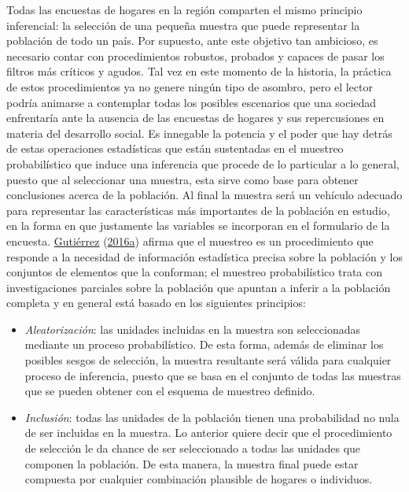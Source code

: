 \documentclass[
  12pt,
  spanish,
]{book}
\providecommand{\tightlist}{%
  \setlength{\itemsep}{0pt}\setlength{\parskip}{0pt}}
\begin{document}
Todas las encuestas de hogares en la región comparten el mismo principio inferencial: la selección de una pequeña muestra que puede representar la población de todo un país. Por supuesto, ante este objetivo tan ambicioso, es necesario contar con procedimientos robustos, probados y capaces de pasar los filtros más críticos y agudos. Tal vez en este momento de la historia, la práctica de estos procedimientos ya no genere ningún tipo de asombro, pero el lector podría animarse a contemplar todas los posibles escenarios que una sociedad enfrentaría ante la ausencia de las encuestas de hogares y sus repercusiones en materia del desarrollo social. Es innegable la potencia y el poder que hay detrás de estas operaciones estadísticas que están sustentadas en el muestreo probabilístico que induce una inferencia que procede de lo particular a lo general, puesto que al seleccionar una muestra, esta sirve como base para obtener conclusiones acerca de la población. Al final la muestra será un vehículo adecuado para representar las características más importantes de la población en estudio, en la forma en que justamente las variables se incorporan en el formulario de la encuesta. \protect\hyperlink{ref-Gutierrez_2016}{Gutiérrez} (\protect\hyperlink{ref-Gutierrez_2016}{2016a}) afirma que el muestreo es un procedimiento que responde a la necesidad de información estadística precisa sobre la población y los conjuntos de elementos que la conforman; el muestreo probabilístico trata con investigaciones parciales sobre la población que apuntan a inferir a la población completa y en general está basado en los siguientes principios:

\begin{itemize}
\tightlist
\item
  \emph{Aleatorización}: las unidades incluidas en la muestra son seleccionadas mediante un proceso probabilístico. De esta forma, además de eliminar los posibles sesgos de selección, la muestra resultante será válida para cualquier proceso de inferencia, puesto que se basa en el conjunto de todas las muestras que se pueden obtener con el esquema de muestreo definido.
\item
  \emph{Inclusión}: todas las unidades de la población tienen una probabilidad no nula de ser incluidas en la muestra. Lo anterior quiere decir que el procedimiento de selección le da chance de ser seleccionado a todas las unidades que componen la población. De esta manera, la muestra final puede estar compuesta por cualquier combinación plausible de hogares o individuos.
\end{itemize}
\end{document}
